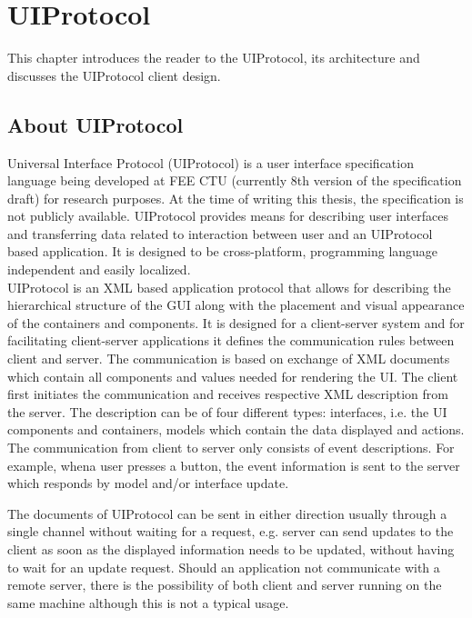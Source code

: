 \chapter{UIProtocol}
This chapter introduces the reader to the UIProtocol, its architecture and discusses the UIProtocol client design.

\section{About UIProtocol}
Universal Interface Protocol (UIProtocol) is a user interface specification language \cite{uip} being developed at FEE CTU (currently 8th version of the specification draft) for research purposes. At the time of writing this thesis, the specification is not publicly available. UIProtocol provides means for describing user interfaces and transferring data related to interaction between user and an UIProtocol based application. It is designed to be cross-platform, programming language independent and easily localized.\\
UIProtocol is an XML based application protocol that allows for describing the hierarchical structure of the GUI along with the placement and visual appearance of the containers and components. It is designed for a client-server system and for facilitating client-server applications it defines the communication rules between client and server. The communication  is based on exchange of XML documents which contain all components and values needed for rendering the UI. The client first initiates the communication and receives respective XML description from the server. The description can be of four different types: interfaces, i.e. the UI components and containers, models which contain the data displayed and actions. The communication from client to server only consists of event descriptions. For example, whena user presses a button, the event information is sent to the server which responds by model and/or interface update.

The documents of UIProtocol can be sent in either direction usually through a single channel without waiting for a request, e.g. server can send updates to the client as soon as the displayed information needs to be updated, without having to wait for an update request. Should an application not communicate with a remote server, there is the possibility of both client and server running on the same machine although this is not a typical usage.

